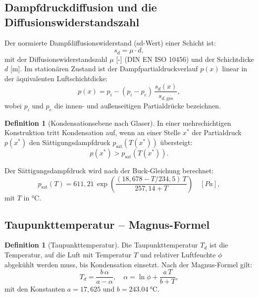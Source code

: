 ﻿\documentclass[a4paper,12pt]{article}
\theoremstyle{definition}
\newtheorem{definition}[theorem]{Definition}
\begin{document}
\subsection{Dampfdruckdiffusion und die Diffusionswiderstandszahl}

Der normierte Dampfdiffusionswiderstand (sd-Wert) einer Schicht ist:
\begin{equation}
  s_d = \mu \cdot d,
  \label{eq:sd}
\end{equation}
mit der Diffusionswiderstandszahl $\mu$ [-] (DIN EN ISO 10456) und der
Schichtdicke $d$ [\si{m}]. Im station\"aren Zustand ist der
Dampfpartialdruckverlauf $p(x)$ linear in der \"aquivalenten
Luftschichtdicke:
\begin{equation}
  p(x) = p_i - (p_i - p_e)\,\frac{s_d(x)}{s_{d,\mathrm{ges}}},
  \label{eq:partialdruck}
\end{equation}
wobei $p_i$ und $p_e$ die innen- und au\ss{}enseitigen Partialdr\"ucke
bezeichnen.

\begin{definition}[Kondensationsebene nach Glaser]
In einer mehrschichtigen Konstruktion tritt Kondensation auf, wenn
an einer Stelle $x^*$ der Partialdruck $p(x^*)$ den
S\"attigungsdampf\-druck $p_{\mathrm{sat}}(T(x^*))$ \"ubersteigt:
\begin{equation}
  p(x^*) > p_{\mathrm{sat}}(T(x^*)).
  \label{eq:kondensation}
\end{equation}
\end{definition}

Der S\"attigungsdampfdruck wird nach der Buck-Gleichung berechnet:
\begin{equation}
  p_{\mathrm{sat}}(T) = 611{,}21\,\exp\!\left(
    \frac{(18{,}678 - T/234{,}5)\,T}{257{,}14 + T}
  \right) \quad [\si{Pa}],
  \label{eq:psat}
\end{equation}
mit $T$ in \si{\celsius}.

\subsection{Taupunkttemperatur -- Magnus-Formel}

\begin{definition}[Taupunkttemperatur]
Die Taupunkttemperatur $T_d$ ist die Temperatur, auf die Luft mit
Temperatur $T$ und relativer Luftfeuchte $\phi$ abgek\"uhlt werden muss,
bis Kondensation einsetzt. Nach der Magnus-Formel gilt:
\begin{equation}
  T_d = \frac{b\,\alpha}{a - \alpha},
  \quad \alpha = \ln\phi + \frac{a\,T}{b + T},
  \label{eq:taupunkt}
\end{equation}
mit den Konstanten $a = 17{,}625$ und $b = \SI{243.04}{\celsius}$.
\end{definition}
\end{document}
